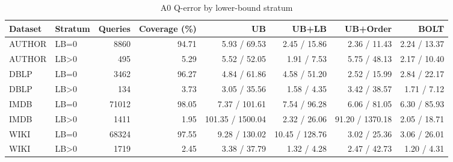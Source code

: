 \begin{table}[H]
\centering
\small
\setlength{\tabcolsep}{5pt}
\caption{A0 Q-error by lower-bound stratum}
\label{tab:C_lb_conditional}
\begin{tabular}{@{}llrrrrrr@{}}
\toprule
Dataset & Stratum & Queries & Coverage (\%) & UB & UB+LB & UB+Order & BOLT \\
\midrule
AUTHOR & LB=0 & 8860 & 94.71 & 5.93 / 69.53 & 2.45 / 15.86 & 2.36 / 11.43 & 2.24 / 13.37 \\
AUTHOR & LB>0 & 495 & 5.29 & 5.52 / 52.05 & 1.91 / 7.53 & 5.75 / 48.13 & 2.17 / 10.40 \\
DBLP & LB=0 & 3462 & 96.27 & 4.84 / 61.86 & 4.58 / 51.20 & 2.52 / 15.99 & 2.84 / 22.17 \\
DBLP & LB>0 & 134 & 3.73 & 3.05 / 35.56 & 1.58 / 4.35 & 3.42 / 38.57 & 1.71 / 7.12 \\
IMDB & LB=0 & 71012 & 98.05 & 7.37 / 101.61 & 7.54 / 96.28 & 6.06 / 81.05 & 6.30 / 85.93 \\
IMDB & LB>0 & 1411 & 1.95 & 101.35 / 1500.04 & 2.32 / 26.06 & 91.20 / 1370.18 & 2.05 / 18.71 \\
WIKI & LB=0 & 68324 & 97.55 & 9.28 / 130.02 & 10.45 / 128.76 & 3.02 / 25.36 & 3.06 / 26.01 \\
WIKI & LB>0 & 1719 & 2.45 & 3.38 / 37.79 & 1.32 / 4.28 & 2.47 / 42.73 & 1.20 / 4.31 \\
\bottomrule
\end{tabular}
\end{table}
